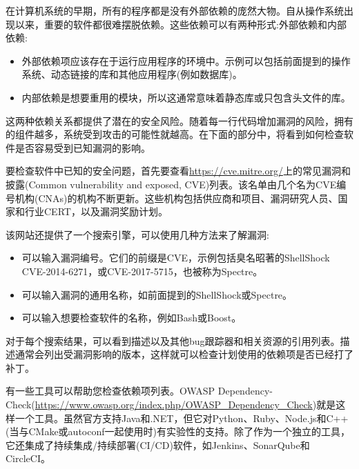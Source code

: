 
在计算机系统的早期，所有的程序都是没有外部依赖的庞然大物。自从操作系统出现以来，重要的软件都很难摆脱依赖。这些依赖可以有两种形式:外部依赖和内部依赖:

\begin{itemize}
\item 
外部依赖项应该存在于运行应用程序的环境中。示例可以包括前面提到的操作系统、动态链接的库和其他应用程序(例如数据库)。

\item 
内部依赖是想要重用的模块，所以这通常意味着静态库或只包含头文件的库。
\end{itemize}

这两种依赖关系都提供了潜在的安全风险。随着每一行代码增加漏洞的风险，拥有的组件越多，系统受到攻击的可能性就越高。在下面的部分中，将看到如何检查软件是否容易受到已知漏洞的影响。


要检查软件中已知的安全问题，首先要查看\url{https://cve.mitre.org/}上的常见漏洞和披露(Common vulnerability and exposed, CVE)列表。该名单由几个名为CVE编号机构(CNAs)的机构不断更新。这些机构包括供应商和项目、漏洞研究人员、国家和行业CERT，以及漏洞奖励计划。

该网站还提供了一个搜索引擎，可以使用几种方法来了解漏洞:

\begin{itemize}
\item 
可以输入漏洞编号。它们的前缀是CVE，示例包括臭名昭著的ShellShock CVE-2014-6271，或CVE-2017-5715，也被称为Spectre。

\item 
可以输入漏洞的通用名称，如前面提到的ShellShock或Spectre。

\item 
可以输入想要检查软件的名称，例如Bash或Boost。
\end{itemize}

对于每个搜索结果，可以看到描述以及其他bug跟踪器和相关资源的引用列表。描述通常会列出受漏洞影响的版本，这样就可以检查计划使用的依赖项是否已经打了补丁。


有一些工具可以帮助您检查依赖项列表。OWASP Dependency-Check(\url{https://www.owasp.org/index.php/OWASP\_Dependency\_Check})就是这样一个工具。虽然官方支持Java和.NET，但它对Python、Ruby、Node.js和C++(当与CMake或autoconf一起使用时)有实验性的支持。除了作为一个独立的工具，它还集成了持续集成/持续部署(CI/CD)软件，如Jenkins、SonarQube和CircleCI。

